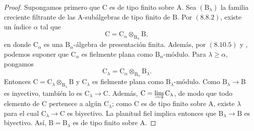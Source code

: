 \begin{proof}
Supongamos primero que $\mathrm{C}$ es de tipo finito sobre $\mathrm{A}$. Sea $(\mathrm{B}_\lambda)$ la familia creciente filtrante de las $\mathrm{A}$-subálgebras de tipo finito de $\mathrm{B}$. Por $(8.8.2)$, existe un índice $\alpha$ tal que
\[
  \mathrm{C}=\mathrm{C}_\alpha\otimes_{\mathrm{B}_\alpha}\mathrm{B},
\]
en donde $\mathrm{C}_\alpha$ es una $\mathrm{B}_\alpha$-álgebra de presentación finita. Además, por $(8.10.5)$ y , podemos suponer que $\mathrm{C}_\alpha$ es fielmente plana como $\mathrm{B}_\alpha$-módulo. Para $\lambda\geqslant\alpha$, pongamos
\[
  \mathrm{C}_\lambda
  =\mathrm{C}_\alpha\otimes_{\mathrm{B}_\alpha}\mathrm{B}_\lambda.
\]
Entonces $\mathrm{C}=\mathrm{C}_\lambda\otimes_{\mathrm{B}_\lambda}\mathrm{B}$ y $\mathrm{C}_\lambda$ es fielmente plana como $\mathrm{B}_\lambda$-módulo. Como $\mathrm{B}_\lambda\to\mathrm{B}$ es inyectivo, también lo es $\mathrm{C}_\lambda\to\mathrm{C}$. Además, $\mathrm{C}=\varinjlim\mathrm{C}_\lambda$, de modo que todo elemento de $\mathrm{C}$ pertenece a algún $\mathrm{C}_\lambda$; como $\mathrm{C}$ es de tipo finito sobre $\mathrm{A}$, existe $\lambda$ para el cual $\mathrm{C}_\lambda\to\mathrm{C}$  es biyectivo. La planitud fiel implica entonces que $\mathrm{B}_\lambda\to\mathrm{B}$ es biyectivo. Así, $\mathrm{B}=\mathrm{B}_\lambda$ es de tipo finito sobre $\mathrm{A}$.


\end{proof}
